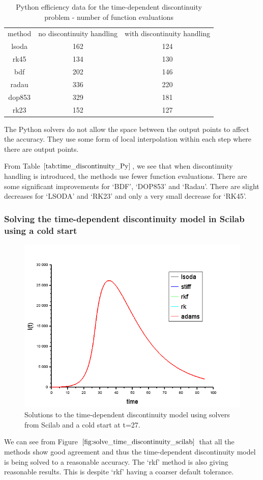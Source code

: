 \begin{table}[H]
\caption {Python efficiency data for the time-dependent discontinuity problem - number of function evaluations} 
\label{tab:time_discontinuity_Py} 
\begin{center}
\begin{tabular}{ c c c }
method & no discontinuity handling & with discontinuity handling \\ 
lsoda & 162 & 124 \\
rk45 & 134 & 130 \\
bdf & 202 & 146 \\
radau & 336 & 220 \\
dop853 & 329 & 181 \\
rk23 & 152 & 127 \\
\end{tabular}
\end{center}
\end{table}

The Python solvers do not allow the space between the output points to affect the accuracy. They use some form of local interpolation within each step where there are output points.

From Table $\ref{tab:time_discontinuity_Py}$, we see that when discontinuity handling is introduced, the methods use fewer function evaluations. There are some significant improvements for `BDF', `DOP853' and `Radau'. There are slight decreases for `LSODA' and `RK23' and only a very small decrease for `RK45'. 

\subsubsection{Solving the time-dependent discontinuity model in Scilab using a cold start} 
\begin{figure}[H]
\centering
\includegraphics[width=0.7\linewidth]{./figures/solve_time_discontinuity_scilab}
\caption{Solutions to the time-dependent discontinuity model using solvers from Scilab and a cold start at t=27.}
\label{fig:solve_time_discontinuity_scilab}
\end{figure}
We can see from Figure $\ref{fig:solve_time_discontinuity_scilab}$ that all the methods show good agreement and thus the time-dependent discontinuity model is being solved to a reasonable accuracy. The `rkf' method is also giving reasonable results. This is despite `rkf' having a coarser default tolerance.

